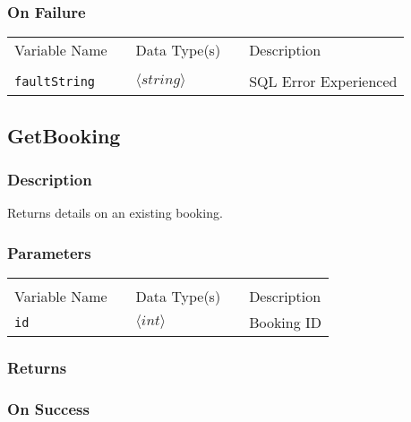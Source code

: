 \subsubsection{On Failure}

\begin{tabular}{lllll}
Variable Name	&		&	Data Type(s)		&	&	Description	\\
				&	&	&	&	\\
\verb!faultString! & \hspace{15mm} & $\langle string\rangle $ & \hspace{15mm} & SQL Error Experienced \\
\end{tabular}


\subsection{GetBooking}

\subsubsection{Description}

Returns details on an existing booking.

\subsubsection{Parameters}

\begin{tabular}{lllll}
				&	&	&	&	\\
Variable Name	&		&	Data Type(s)		&	&	Description	\\
\verb!id! & \hspace{15mm} & $\langle int\rangle $ & \hspace{15mm} & Booking ID \\
\end{tabular}

\subsubsection{Returns}

\subsubsection{On Success}

